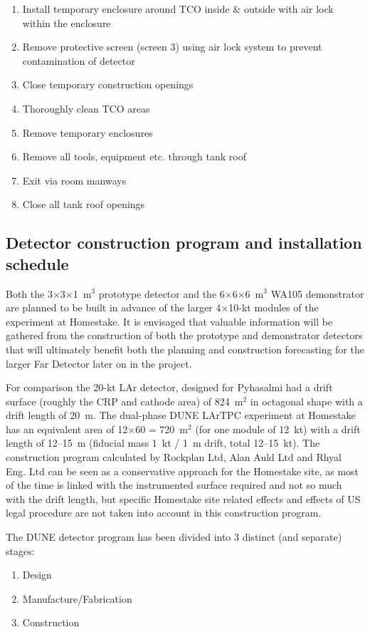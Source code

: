 \begin{enumerate}
\item{Install temporary enclosure around TCO inside \& outside with air lock within the enclosure}
\item{ Remove protective screen (screen 3) using air lock system to prevent contamination of detector}
\item{Close temporary construction openings}
\item{Thoroughly clean TCO areas}
\item{Remove temporary enclosures}
\item{Remove all tools, equipment etc. through tank roof}
\item{Exit via room manways}
\item{Close all tank roof openings}
\end{enumerate}

\subsection{Detector construction program and installation schedule}

Both the 3$\times$3$\times$1~m$^3$ prototype detector and the
6$\times$6$\times$6~m$^3$ WA105 demonstrator are planned to be built in
advance of the larger 4$\times$10-kt modules of the experiment at
Homestake. It is envisaged that valuable information will be gathered
from the construction of both the prototype and demonstrator detectors
that will ultimately benefit both the planning and construction
forecasting for the larger Far Detector later on in the project.

For comparison the 20-kt LAr detector, designed for Pyhasalmi had a
drift surface (roughly the CRP and cathode area) of 824~m$^2$ in
octagonal shape with a drift length of 20~m. The dual-phase DUNE
LArTPC experiment at Homestake has an equivalent area of 12$\times$60 =
720~m$^2$ (for one module of 12~kt) with a drift length of 12--15~m
(fiducial mass 1~kt / 1~m drift, total 12--15~kt). The construction
program calculated by Rockplan Ltd, Alan Auld Ltd and Rhyal Eng. Ltd
can be seen as a conservative approach for the Homestake site, as most
of the time is linked with the instrumented surface required and not
so much with the drift length, but specific Homestake site related
effects and effects of US legal procedure are not taken into account
in this construction program.

The DUNE detector program has been divided into 3 distinct (and separate)
stages:
\begin{enumerate}
\item{Design}
\item{Manufacture/Fabrication} 
\item{Construction}
\end{enumerate}  

